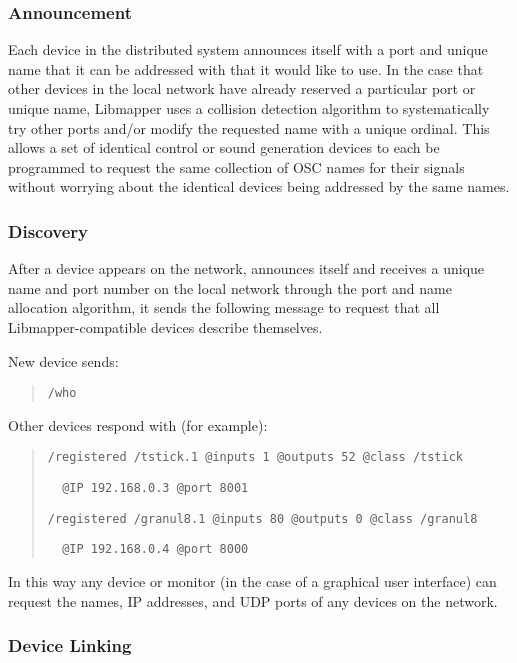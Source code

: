 \subsubsection{Announcement}

Each device in the distributed system announces itself with a port and unique name that it can be addressed with that it would like to use. In the case that other devices in the local network have already reserved a particular port or unique name, Libmapper uses a collision detection algorithm to systematically try other ports and/or modify the requested name with a unique ordinal. This allows a set of identical control or sound generation devices to each be programmed to request the same collection of OSC names for their signals without worrying about the identical devices being addressed by the same names.

\subsubsection{Discovery}

After a device appears on the network, announces itself and receives a unique name and port number on the local network through the port and name allocation algorithm, it sends the following message to request that all Libmapper-compatible devices describe themselves.

New device sends:

\begin{quote}
\verb#/who#
\end{quote}

Other devices respond with (for example):

\begin{quote}
\verb#/registered /tstick.1 @inputs 1 @outputs 52 @class /tstick# 

\verb#  @IP 192.168.0.3 @port 8001#

\verb#/registered /granul8.1 @inputs 80 @outputs 0 @class /granul8#

\verb#  @IP 192.168.0.4 @port 8000#
\end{quote}

In this way any device or monitor (in the case of a graphical user interface) can request the names, IP addresses, and UDP ports of any devices on the network. 

\subsubsection{Device Linking}

